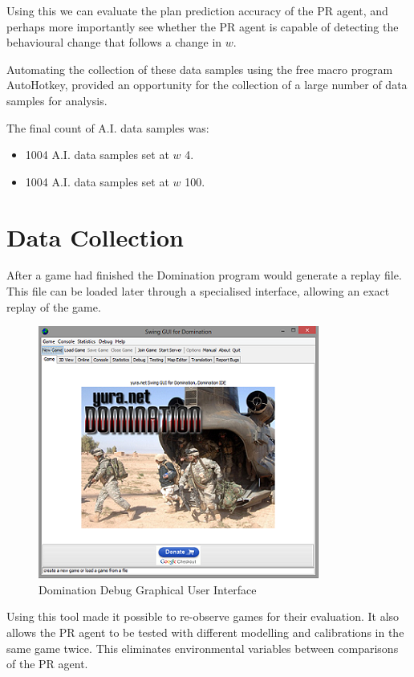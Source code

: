 \documentclass[parskip]{cs4rep}
\begin{document}
Using this we can evaluate the plan prediction accuracy of the PR agent, and perhaps more importantly see whether the PR agent is capable of detecting the behavioural change that follows a change in $w$.

Automating the collection of these data samples using the free macro program AutoHotkey, provided an opportunity for the collection of a large number of data samples for analysis.

The final count of A.I. data samples was:

\begin{itemize}
\item
1004 A.I. data samples set at $w$ 4.
\item
1004 A.I. data samples set at $w$ 100.
\end{itemize}

\newpage

\section{Data Collection}

After a game had finished the Domination program would generate a replay file. This file can be loaded later through a specialised interface, allowing an exact replay of the game.

\begin{figure}[h]
\centerline{
\includegraphics{images/domination-debug-gui.png}
}
\caption{Domination Debug Graphical User Interface}
\label{fig:dom-debug-gui}
\end{figure}

Using this tool made it possible to re-observe games for their evaluation. It also allows the PR agent to be tested with different modelling and calibrations in the same game twice. This eliminates environmental variables between comparisons of the PR agent.
\end{document}

